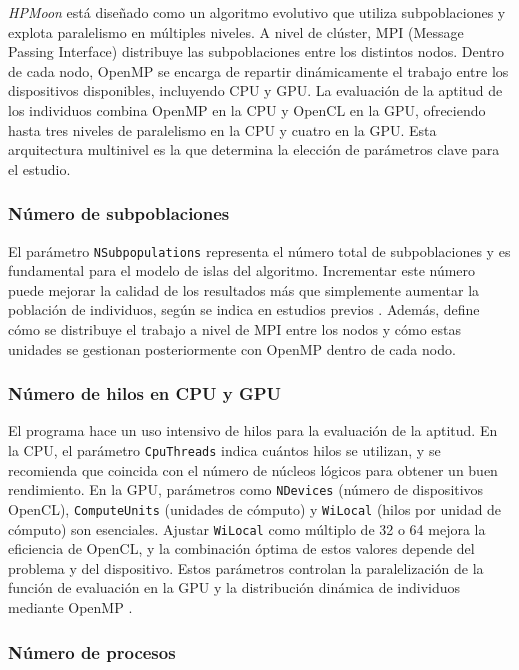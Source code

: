\textit{HPMoon} está diseñado como un algoritmo evolutivo que utiliza subpoblaciones y explota paralelismo en múltiples niveles. A nivel de clúster, MPI (Message Passing Interface) distribuye las subpoblaciones entre los distintos nodos. Dentro de cada nodo, OpenMP se encarga de repartir dinámicamente el trabajo entre los dispositivos disponibles, incluyendo CPU y GPU. La evaluación de la aptitud de los individuos combina OpenMP en la CPU y OpenCL en la GPU, ofreciendo hasta tres niveles de paralelismo en la CPU y cuatro en la GPU. Esta arquitectura multinivel es la que determina la elección de parámetros clave para el estudio.

\subsubsection{Número de subpoblaciones}

El parámetro \texttt{NSubpopulations} representa el número total de subpoblaciones y es fundamental para el modelo de islas del algoritmo. Incrementar este número puede mejorar la calidad de los resultados más que simplemente aumentar la población de individuos, según se indica en estudios previos \cite{escobar2020energy}. Además, define cómo se distribuye el trabajo a nivel de MPI entre los nodos y cómo estas unidades se gestionan posteriormente con OpenMP dentro de cada nodo.

\subsubsection{Número de hilos en CPU y GPU}

El programa hace un uso intensivo de hilos para la evaluación de la aptitud. En la CPU, el parámetro \texttt{CpuThreads} indica cuántos hilos se utilizan, y se recomienda que coincida con el número de núcleos lógicos para obtener un buen rendimiento. En la GPU, parámetros como \texttt{NDevices} (número de dispositivos OpenCL), \texttt{ComputeUnits} (unidades de cómputo) y \texttt{WiLocal} (hilos por unidad de cómputo) son esenciales. Ajustar \texttt{WiLocal} como múltiplo de 32 o 64 mejora la eficiencia de OpenCL, y la combinación óptima de estos valores depende del problema y del dispositivo. Estos parámetros controlan la paralelización de la función de evaluación en la GPU y la distribución dinámica de individuos mediante OpenMP \cite{escobar2020energy}.

\subsubsection{Número de procesos}

